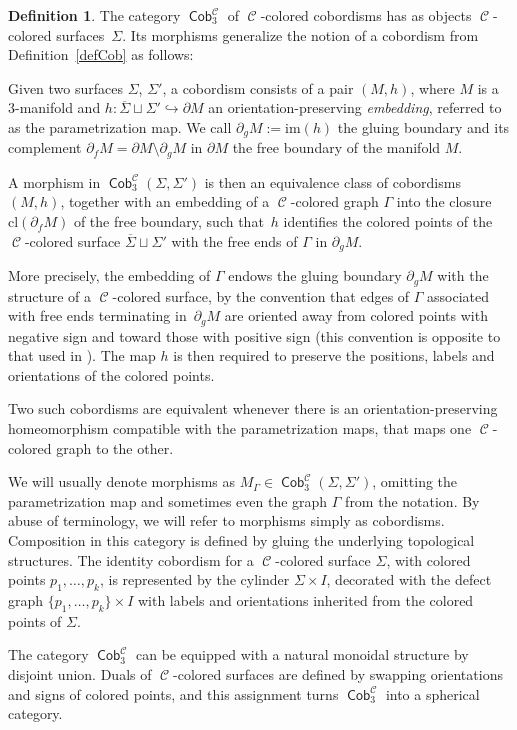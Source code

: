 \documentclass[10pt,a4paper]{amsart}
\DeclareMathOperator{\Cob}{\mathsf{Cob}}
\DeclareMathOperator{\calc}{\mathcal{C}}
\numberwithin{equation}{section}
\theoremstyle{definition}
\newtheorem{Definition}[Definition]{Definition}
\begin{document}
\begin{Definition}\label{defCobDef}
The category $\Cob_3^{\calc}$ of $\calc$-colored cobordisms has as objects $\calc$-colored surfaces~$\Sigma$. Its morphisms generalize the notion of a cobordism from Definition~\ref{defCob} as follows:

Given two surfaces $\Sigma$, $\Sigma'$, a cobordism consists of a pair $(M, h)$, where $M$ is a 3-manifold and $h\colon \overline{\Sigma} \sqcup \Sigma' \hookrightarrow \partial M$ an orientation-preserving \textit{embedding}, referred to as the parametrization map. We call $\partial_gM := \mathrm{im}(h)$ the gluing boundary and its complement $\partial_fM = \partial M \setminus \partial_gM$ in $\partial M$ the free boundary of the manifold $M$.

A morphism in $\Cob_3^{\calc}(\Sigma, \Sigma')$ is then an equivalence class of cobordisms $(M, h)$, together with an embedding of a $\calc$-colored graph $\Gamma$ into the closure $\mathrm{cl}(\partial _f M)$ of the free boundary, such that~$h$ identifies the colored points of the $\calc$-colored surface $\overline{\Sigma} \sqcup \Sigma'$ with the free ends of $\Gamma$ in $\partial_gM$.

More precisely, the embedding of $\Gamma$ endows the gluing boundary $\partial_gM$ with the structure of a $\calc$-colored surface, by the convention that edges of $\Gamma$ associated with free ends terminating in~$\partial_gM$ are oriented away from colored points with negative sign and toward those with positive sign (this convention is opposite to that used in \cite{F}). The map $h$ is then required to preserve the positions, labels and orientations of the colored points.

 Two such cobordisms are equivalent whenever there is an orientation-preserving homeomorphism compatible with the parametrization maps, that maps one $\calc$-colored graph to the other.

 We will usually denote morphisms as $M_{\Gamma} \in \Cob_3^{\calc}(\Sigma, \Sigma')$, omitting the parametrization map and sometimes even the graph $\Gamma$ from the notation. By abuse of terminology, we will refer to morphisms simply as cobordisms.
 Composition in this category is defined by gluing the underlying topological structures. The identity cobordism for a $\calc$-colored surface $\Sigma$, with colored points $p_1, \dots, p_k$, is represented by the cylinder $\Sigma \times I$, decorated with the defect graph $\{p_1, \dots, p_k\} \times I$ with labels and orientations inherited from the colored points of $\Sigma$.
\end{Definition}
The category $\Cob_3^{\calc}$ can be equipped with a natural monoidal structure by disjoint union. Duals of $\calc$-colored surfaces are defined by swapping orientations and signs of colored points, and this assignment turns $\Cob_3^{\calc}$ into a spherical category.
\end{document}
